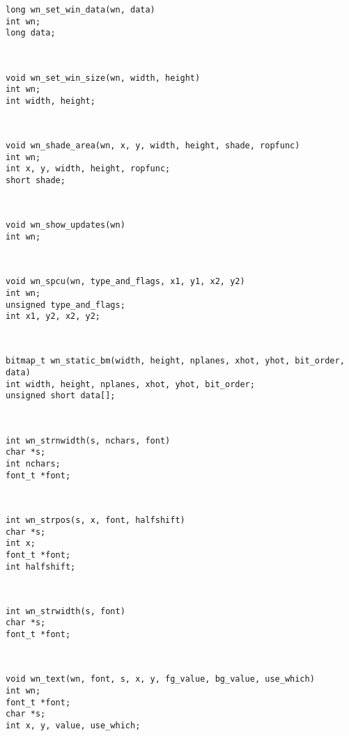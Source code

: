 \parbox[t]{5in}{\tt long wn\_set\_win\_data(wn, data)\\int wn;\\long data;}\> \pageref{wn_set_win_data}\\[0.1in]
\parbox[t]{5in}{\tt void wn\_set\_win\_size(wn, width, height)\\int wn;\\int width, height;}\> \pageref{wn_set_win_size}\\[0.1in]
\parbox[t]{5in}{\tt void wn\_shade\_area(wn, x, y, width, height, shade, ropfunc)\\int wn;\\int x, y, width, height, ropfunc;\\short shade;}\> \pageref{wn_shade_area}\\[0.1in]
\parbox[t]{5in}{\tt void wn\_show\_updates(wn)\\int wn;}\> \pageref{wn_show_updates}\\[0.1in]
\parbox[t]{5in}{\tt void wn\_spcu(wn, type\_and\_flags, x1, y1, x2, y2)\\int wn;\\unsigned type\_and\_flags;\\int x1, y2, x2, y2;}\> \pageref{wn_spcu}\\[0.1in]
\parbox[t]{5in}{\tt bitmap\_t wn\_static\_bm(width, height, nplanes, xhot, yhot, bit\_order, data)\\int width, height, nplanes, xhot, yhot, bit\_order;\\unsigned short data[];}\> \pageref{wn_static_bm}\\[0.1in]
\parbox[t]{5in}{\tt int wn\_strnwidth(s, nchars, font)\\char *s;\\int nchars;\\font\_t *font;}\> \pageref{wn_strnwidth}\\[0.1in]
\parbox[t]{5in}{\tt int wn\_strpos(s, x, font, halfshift)\\char *s;\\int x;\\font\_t *font;\\int halfshift;}\> \pageref{wn_strpos}\\[0.1in]
\parbox[t]{5in}{\tt int wn\_strwidth(s, font)\\char *s;\\font\_t *font;}\> \pageref{wn_strwidth}\\[0.1in]
\parbox[t]{5in}{\tt void wn\_text(wn, font, s, x, y, fg\_value, bg\_value, use\_which)\\int wn;\\font\_t *font;\\char *s;\\int x, y, value, use\_which;}\> \pageref{wn_text}\\[0.1in]

